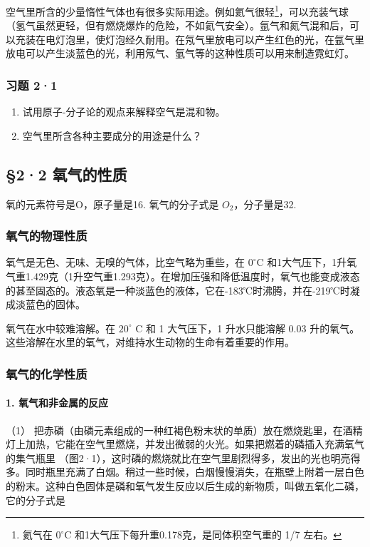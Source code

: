 空气里所含的少量惰性气体也有很多实际用途。例如氦气很轻\footnote{氦气在
  \(0^{\circ}\mathrm{C}\) 和1大气压下每升重0.178克，是同体积空气重的 1/7
  左右。}，可以充装气球（氢气虽然更轻，但有燃烧爆炸的危险，不如氦气安全）。氩气和氮气混和后，可以充装在电灯泡里，使灯泡经久耐用。在氖气里放电可以产生红色的光，在氩气里放电可以产生淡蓝色的光，利用氖气、氩气等的这种性质可以用来制造霓虹灯。

\subsubsection{习题 2·1}

\begin{enumerate}
\item
  试用原子-分子论的观点来解释空气是混和物。
\item
  空气里所含各种主要成分的用途是什么？
\end{enumerate}

\subsection{§2·2 氧气的性质}

氧的元素符号是O，原子量是16. 氧气的分子式是 \(O_{2}\)，分子量是32.

\subsubsection{氧气的物理性质}

氧气是无色、无味、无嗅的气体，比空气略为重些，在 \(0^{\circ}\mathrm{C}\)
和1大气压下，1升氧气重1.429克（1升空气重1.293克）。在增加压强和降低温度时，氧气也能变成液态的甚至固态的。液态氧是一种淡蓝色的液体，它在-183℃时沸腾，并在-219℃时凝成淡蓝色的固体。

氧气在水中较难溶解。在 \(20^{\circ}\) C 和 1 大气压下，1 升水只能溶解
0.03
升的氧气。这些溶解在水里的氧气，对维持水生动物的生命有着重要的作用。

\subsubsection{氧气的化学性质}

\paragraph{1. 氧气和非金属的反应}

（1）
把赤磷（由磷元素组成的一种红褐色粉末状的单质）放在燃烧匙里，在酒精灯上加热，它能在空气里燃烧，并发出微弱的火光。如果把燃着的磷插入充满氧气的集气瓶里
（图2·1），这时磷的燃烧就比在空气里剧烈得多，发出的光也明亮得多。同时瓶里充满了白烟。稍过一些时候，白烟慢慢消失，在瓶壁上附着一层白色的粉末。这种白色固体是磷和氧气发生反应以后生成的新物质，叫做五氧化二磷，它的分子式是

